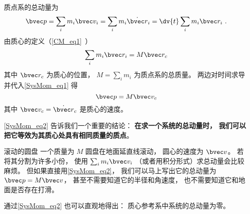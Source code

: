 

质点系的总动量为
\begin{equation}\label{SysMom_eq1}
\bvec p = \sum_i m_i \bvec v_i = \sum_i m_i \dot{\bvec r}_i = \dv{t}  \sum_i m_i \bvec r_i~.
\end{equation}
由质心的定义（\autoref{CM_eq1}~） 
\begin{equation}
\sum_i m_i \bvec r_i = M \bvec r_c
\end{equation}
其中 $\bvec r_c$ 为质心的位置， $M = \sum_i m_i$ 为质点系的总质量。 两边对时间求导并代入\autoref{SysMom_eq1} 得
\begin{equation}\label{SysMom_eq2}
\bvec p = M\bvec v_c
\end{equation}
其中 $\bvec v_c = \dot{\bvec r}_c$ 是质心的速度。

\autoref{SysMom_eq2} 告诉我们一个重要的结论： \textbf{在求一个系统的总动量时， 我们可以把它等效为其质心处具有相同质量的质点}。

\begin{example}{滚动的圆盘}
一个质量为 $M$ 圆盘在地面延直线滚动， 圆心的速度为 $\bvec v$。 若将其分割为许多小份， 使用 $\sum_i m_i \bvec v_i$ （或者用积分形式）求总动量会比较麻烦。 但如果直接用\autoref{SysMom_eq2}， 我们可以马上写出它的总动量为 $\bvec p = M\bvec v$， 甚至不需要知道它的半径和角速度， 也不需要知道它和地面是否存在打滑。
\end{example}

通过\autoref{SysMom_eq2} 也可以直观地得出： 质心参考系中系统的总动量为零。
